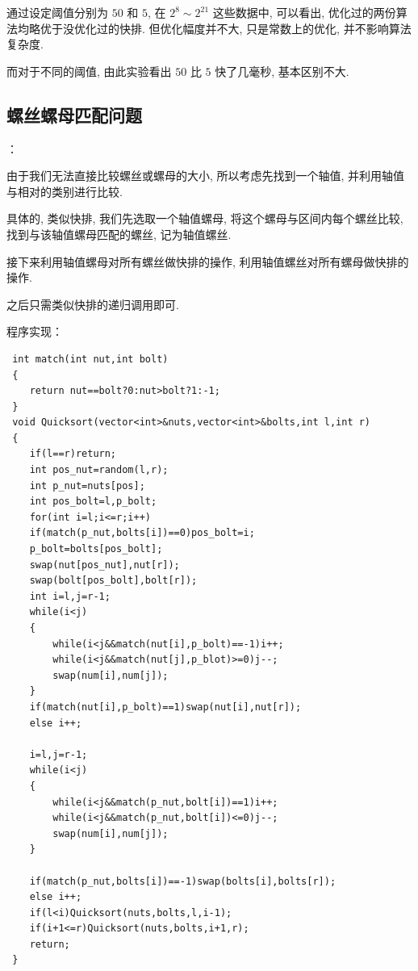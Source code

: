 通过设定阈值分别为 $50$ 和 $5$, 在 $2^8\sim 2^{21}$ 这些数据中, 可以看出, 优化过的两份算法均略优于没优化过的快排.
但优化幅度并不大, 只是常数上的优化, 并不影响算法复杂度.

而对于不同的阈值, 由此实验看出 $50$ 比 $5$ 快了几毫秒, 基本区别不大.

\subsection{螺丝螺母匹配问题}：
 
由于我们无法直接比较螺丝或螺母的大小, 所以考虑先找到一个轴值, 并利用轴值与相对的类别进行比较.

具体的, 类似快排, 我们先选取一个轴值螺母, 将这个螺母与区间内每个螺丝比较, 找到与该轴值螺母匹配的螺丝, 记为轴值螺丝.

接下来利用轴值螺母对所有螺丝做快排的操作, 利用轴值螺丝对所有螺母做快排的操作.

之后只需类似快排的递归调用即可.

程序实现：

 \begin{lstlisting}
 int match(int nut,int bolt)
 {
 	return nut==bolt?0:nut>bolt?1:-1;
 }
 void Quicksort(vector<int>&nuts,vector<int>&bolts,int l,int r)
 {
 	if(l==r)return;
 	int pos_nut=random(l,r);
 	int p_nut=nuts[pos];
 	int pos_bolt=l,p_bolt;
 	for(int i=l;i<=r;i++)
 	if(match(p_nut,bolts[i])==0)pos_bolt=i;
 	p_bolt=bolts[pos_bolt];
 	swap(nut[pos_nut],nut[r]);
 	swap(bolt[pos_bolt],bolt[r]);
 	int i=l,j=r-1;
 	while(i<j)
 	{
 		while(i<j&&match(nut[i],p_bolt)==-1)i++;
 		while(i<j&&match(nut[j],p_blot)>=0)j--;
 		swap(num[i],num[j]);
 	}
 	if(match(nut[i],p_bolt)==1)swap(nut[i],nut[r]);
 	else i++;
 	
 	i=l,j=r-1;
 	while(i<j)
 	{
 		while(i<j&&match(p_nut,bolt[i])==1)i++;
 		while(i<j&&match(p_nut,bolt[i])<=0)j--;
 		swap(num[i],num[j]);
 	}
 	
 	if(match(p_nut,bolts[i])==-1)swap(bolts[i],bolts[r]);
 	else i++;
 	if(l<i)Quicksort(nuts,bolts,l,i-1);
 	if(i+1<=r)Quicksort(nuts,bolts,i+1,r);
 	return;
 }
 \end{lstlisting}

